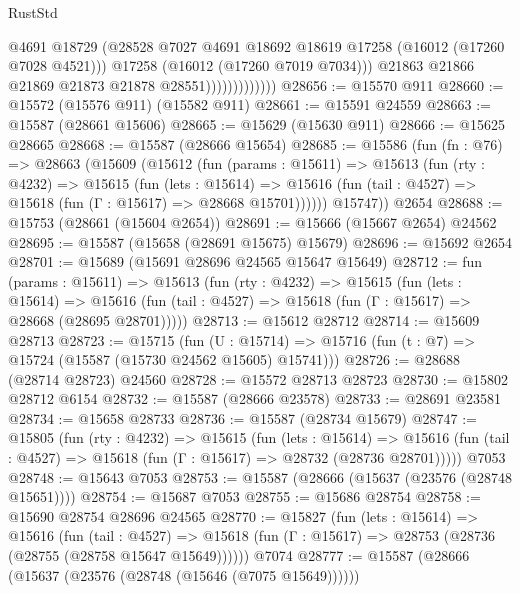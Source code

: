 \begin{lexlean}{RustStd}
\begin{coremodule}
                                @4691
                                @18729
                                (@28528
                                  @7027
                                  @4691
                                  @18692
                                  @18619
                                  @17258
                                  (@16012 (@17260 @7028 @4521)))
                                @17258
                                (@16012 (@17260 @7019 @7034)))
                              @21863
                              @21866
                              @21869
                              @21873
                              @21878
                              @28551)))))))))))))
@28656 := @15570 @911
@28660 := @15572 (@15576 @911) (@15582 @911)
@28661 := @15591 @24559
@28663 := @15587 (@28661 @15606)
@28665 := @15629 (@15630 @911)
@28666 := @15625 @28665
@28668 := @15587 (@28666 @15654)
@28685 := @15586
    (fun (fn : @76) =>
    @28663
      (@15609
        (@15612
          (fun (params : @15611) =>
          @15613
            (fun (rty : @4232) =>
            @15615
              (fun (lets : @15614) =>
              @15616 (fun (tail : @4527) => @15618 (fun (Γ : @15617) => @28668 @15701))))))
        @15747))
    @2654
@28688 := @15753 (@28661 (@15604 @2654))
@28691 := @15666 (@15667 @2654) @24562
@28695 := @15587 (@15658 (@28691 @15675) @15679)
@28696 := @15692 @2654
@28701 := @15689 (@15691 @28696 @24565 @15647 @15649)
@28712 := fun (params : @15611) =>
  @15613
    (fun (rty : @4232) =>
    @15615
      (fun (lets : @15614) =>
      @15616 (fun (tail : @4527) => @15618 (fun (Γ : @15617) => @28668 (@28695 @28701)))))
@28713 := @15612 @28712
@28714 := @15609 @28713
@28723 := @15715
    (fun (U : @15714) => @15716 (fun (t : @7) => @15724 (@15587 (@15730 @24562 @15605) @15741)))
@28726 := @28688 (@28714 @28723) @24560
@28728 := @15572 @28713 @28723
@28730 := @15802 @28712 @6154
@28732 := @15587 (@28666 @23578)
@28733 := @28691 @23581
@28734 := @15658 @28733
@28736 := @15587 (@28734 @15679)
@28747 := @15805
    (fun (rty : @4232) =>
    @15615
      (fun (lets : @15614) =>
      @15616 (fun (tail : @4527) => @15618 (fun (Γ : @15617) => @28732 (@28736 @28701)))))
    @7053
@28748 := @15643 @7053
@28753 := @15587 (@28666 (@15637 (@23576 (@28748 @15651))))
@28754 := @15687 @7053
@28755 := @15686 @28754
@28758 := @15690 @28754 @28696 @24565
@28770 := @15827
    (fun (lets : @15614) =>
    @15616
      (fun (tail : @4527) =>
      @15618 (fun (Γ : @15617) => @28753 (@28736 (@28755 (@28758 @15647 @15649))))))
    @7074
@28777 := @15587 (@28666 (@15637 (@23576 (@28748 (@15646 (@7075 @15649))))))

\end{coremodule}
\end{lexlean}
